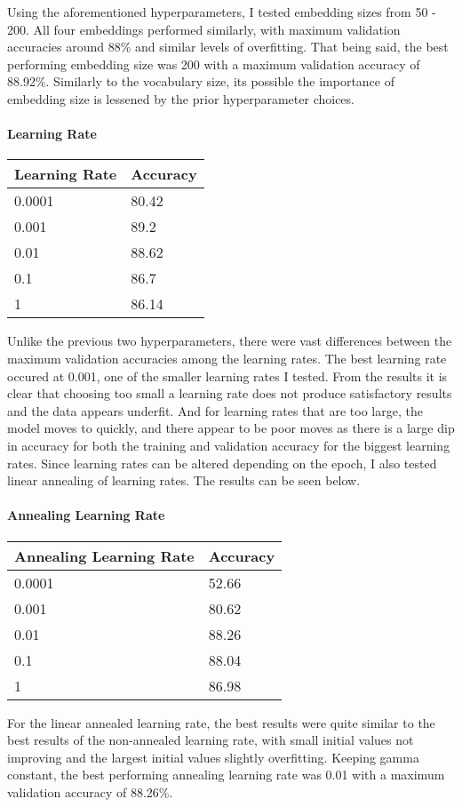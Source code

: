 \documentclass[11pt]{article}
\begin{document}
Using the aforementioned hyperparameters, I tested embedding sizes from
50 - 200. All four embeddings performed similarly, with maximum
validation accuracies around 88\% and similar levels of overfitting.
That being said, the best performing embedding size was 200 with a
maximum validation accuracy of 88.92\%. Similarly to the vocabulary
size, its possible the importance of embedding size is lessened by the
prior hyperparameter choices.

    \paragraph{Learning Rate}\label{learning-rate}

\begin{longtable}[]{@{}ll@{}}
\toprule
Learning Rate & Accuracy\tabularnewline
\midrule
\endhead
0.0001 & 80.42\tabularnewline
0.001 & 89.2\tabularnewline
0.01 & 88.62\tabularnewline
0.1 & 86.7\tabularnewline
1 & 86.14\tabularnewline
\bottomrule
\end{longtable}

Unlike the previous two hyperparameters, there were vast differences
between the maximum validation accuracies among the learning rates. The
best learning rate occured at 0.001, one of the smaller learning rates I
tested. From the results it is clear that choosing too small a learning
rate does not produce satisfactory results and the data appears
underfit. And for learning rates that are too large, the model moves to
quickly, and there appear to be poor moves as there is a large dip in
accuracy for both the training and validation accuracy for the biggest
learning rates. Since learning rates can be altered depending on the
epoch, I also tested linear annealing of learning rates. The results can
be seen below.

    \paragraph{Annealing Learning Rate}\label{annealing-learning-rate}

\begin{longtable}[]{@{}ll@{}}
\toprule
Annealing Learning Rate & Accuracy\tabularnewline
\midrule
\endhead
0.0001 & 52.66\tabularnewline
0.001 & 80.62\tabularnewline
0.01 & 88.26\tabularnewline
0.1 & 88.04\tabularnewline
1 & 86.98\tabularnewline
\bottomrule
\end{longtable}

For the linear annealed learning rate, the best results were quite
similar to the best results of the non-annealed learning rate, with
small initial values not improving and the largest initial values
slightly overfitting. Keeping gamma constant, the best performing
annealing learning rate was 0.01 with a maximum validation accuracy of
88.26\%.
\end{document}
